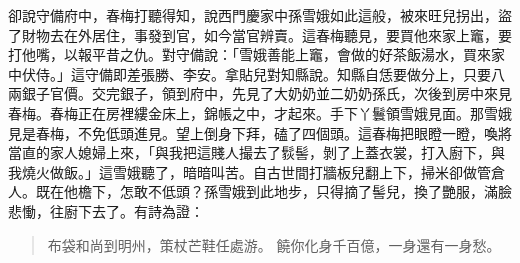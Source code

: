 卻說守備府中，春梅打聽得知，說西門慶家中孫雪娥如此這般，被來旺兒拐出，盜了財物去在外居住，事發到官，如今當官辨賣。這春梅聽見，要買他來家上竈，要打他嘴，以報平昔之仇。對守備說：「雪娥善能上竈，會做的好茶飯湯水，買來家中伏侍。」這守備即差張勝、李安。拿貼兒對知縣說。知縣自恁要做分上，只要八兩銀子官價。交完銀子，領到府中，先見了大奶奶並二奶奶孫氏，次後到房中來見春梅。春梅正在房裡縷金床上，錦帳之中，才起來。手下丫鬟領雪娥見面。那雪娥見是春梅，不免低頭進見。望上倒身下拜，磕了四個頭。這春梅把眼瞪一瞪，喚將當直的家人媳婦上來，「與我把這賤人撮去了䯼髻，剝了上蓋衣裳，打入廚下，與我燒火做飯。」這雪娥聽了，暗暗叫苦。自古世間打牆板兒翻上下，掃米卻做管倉人。既在他檐下，怎敢不低頭？孫雪娥到此地步，只得摘了髻兒，換了艷服，滿臉悲慟，往廚下去了。有詩為證：
\begin{quote}
布袋和尚到明州，策杖芒鞋任處游。
饒你化身千百億，一身還有一身愁。
\end{quote}
